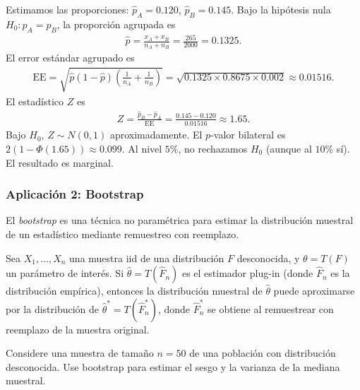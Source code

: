 \begin{solucion}
Estimamos las proporciones: $\hat{p}_A = 0.120$, $\hat{p}_B = 0.145$. Bajo la
hip\'otesis nula $H_0: p_A = p_B$, la proporci\'on agrupada es
\begin{align}
 \hat{p} = \frac{x_A + x_B}{n_A + n_B} = \frac{265}{2000} = 0.1325.
\end{align}
El error est\'andar agrupado es
\begin{align}
 \text{EE} = \sqrt{\hat{p}(1-\hat{p})\left(\frac{1}{n_A} + \frac{1}{n_B}\right)}
 = \sqrt{0.1325 \times 0.8675 \times 0.002} \approx 0.01516.
\end{align}
El estad\'istico $Z$ es
\begin{align}
 Z = \frac{\hat{p}_B - \hat{p}_A}{\text{EE}} = \frac{0.145 - 0.120}{0.01516} \approx 1.65.
\end{align}
Bajo $H_0$, $Z \sim N(0,1)$ aproximadamente. El $p$-valor bilateral es
$2(1 - \Phi(1.65)) \approx 0.099$. Al nivel $5\%$, no rechazamos $H_0$ (aunque al $10\%$
s\'i). El resultado es marginal.
\end{solucion}



\subsubsection{Aplicaci\'on 2: Bootstrap}

El \emph{bootstrap} es una t\'ecnica no param\'etrica para estimar la distribuci\'on
muestral de un estad\'istico mediante remuestreo con reemplazo.

\begin{teorema}
Sea $X_1, \ldots, X_n$ una muestra iid de una distribuci\'on $F$ desconocida, y
$\theta = T(F)$ un par\'ametro de inter\'es. Si $\hat{\theta} = T(\hat{F}_n)$ es
el estimador plug-in (donde $\hat{F}_n$ es la distribuci\'on emp\'irica), entonces
la distribuci\'on muestral de $\hat{\theta}$ puede aproximarse por la distribuci\'on
de $\hat{\theta}^* = T(\hat{F}_n^*)$, donde $\hat{F}_n^*$ se obtiene al
remuestrear con reemplazo de la muestra original.
\end{teorema}

\begin{ejemplo}
 \label{exmp:3.2.8}
Considere una muestra de tama\~no $n = 50$ de una poblaci\'on con distribuci\'on
desconocida. Use bootstrap para estimar el sesgo y la varianza de la mediana
muestral.
\end{ejemplo}

